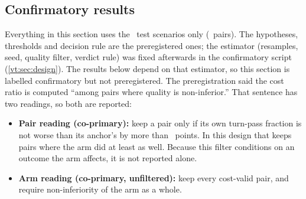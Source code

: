 \subsection{Confirmatory results}\label{vt:sec:confirm}

Everything in this section uses the \NTest\ test scenarios only (\NTestPairs\ pairs). The hypotheses,
thresholds and decision rule are the preregistered ones; the estimator (resamples, seed, quality filter,
verdict rule) was fixed afterwards in the confirmatory script (\cref{vt:sec:design}). The results below depend on
that estimator, so this section is labelled confirmatory but not preregistered. The preregistration said the cost ratio is computed ``among pairs where quality is
non-inferior.'' That sentence has two readings, so both are reported:
\begin{itemize}
  \item \textbf{Pair reading (co-primary):} keep a pair only if its own turn-pass fraction is not worse than
    its anchor's by more than \NIMarginPts\ points. In this design that keeps pairs where the arm did at
    least as well. Because this filter conditions on an outcome the arm affects, it is not reported alone.
  \item \textbf{Arm reading (co-primary, unfiltered):} keep every cost-valid pair, and require non-inferiority of
    the arm as a whole.
\end{itemize}

\begin{table}[tbp]
\centering\small
\caption{Primary endpoint: geometric-mean cost ratio, arm over plain host, test split, with 95\,\%
scenario-cluster bootstrap intervals. ``Pairs kept'' counts pairs that pass the pair-level quality filter
out of all cost-valid test pairs.}
\label{vt:tab:primary}

\end{table}



